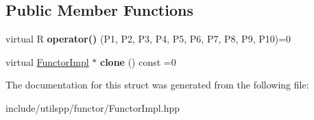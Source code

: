 \subsection*{Public Member Functions}
\begin{DoxyCompactItemize}
\item 
\hypertarget{structutilspp_1_1FunctorImpl_3_01R_00_01TYPE__LIST__10_07P1_00_01P2_00_01P3_00_01P4_00_01P5_00_0dcb5930806c25abd002b833487c3746a_aa30c8cd1173e54081d8ff77f539f6bb0}{virtual R {\bfseries operator()} (P1, P2, P3, P4, P5, P6, P7, P8, P9, P10)=0}\label{structutilspp_1_1FunctorImpl_3_01R_00_01TYPE__LIST__10_07P1_00_01P2_00_01P3_00_01P4_00_01P5_00_0dcb5930806c25abd002b833487c3746a_aa30c8cd1173e54081d8ff77f539f6bb0}

\item 
\hypertarget{structutilspp_1_1FunctorImpl_3_01R_00_01TYPE__LIST__10_07P1_00_01P2_00_01P3_00_01P4_00_01P5_00_0dcb5930806c25abd002b833487c3746a_a255f703c81d7fcf46376a23568fae31b}{virtual \hyperlink{structutilspp_1_1FunctorImpl}{Functor\-Impl} $\ast$ {\bfseries clone} () const =0}\label{structutilspp_1_1FunctorImpl_3_01R_00_01TYPE__LIST__10_07P1_00_01P2_00_01P3_00_01P4_00_01P5_00_0dcb5930806c25abd002b833487c3746a_a255f703c81d7fcf46376a23568fae31b}

\end{DoxyCompactItemize}


The documentation for this struct was generated from the following file\-:\begin{DoxyCompactItemize}
\item 
include/utilspp/functor/Functor\-Impl.\-hpp\end{DoxyCompactItemize}
